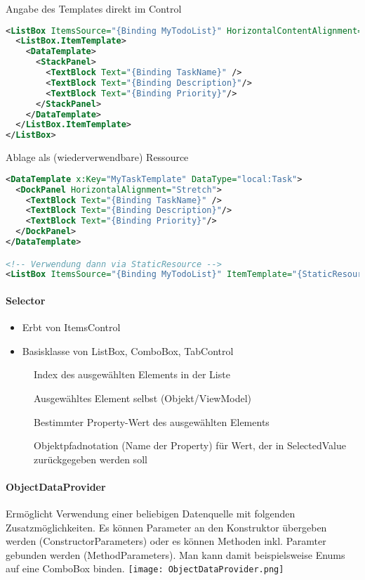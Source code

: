 Angabe des Templates direkt im Control
\begin{lstlisting}[language=xml]
<ListBox ItemsSource="{Binding MyTodoList}" HorizontalContentAlignment="Stretch"> 
  <ListBox.ItemTemplate> 
    <DataTemplate> 
      <StackPanel> 
        <TextBlock Text="{Binding TaskName}" /> 
        <TextBlock Text="{Binding Description}"/> 
        <TextBlock Text="{Binding Priority}"/> 
      </StackPanel> 
    </DataTemplate> 
  </ListBox.ItemTemplate> 
</ListBox> 
\end{lstlisting}

Ablage als (wiederverwendbare) Ressource
\begin{lstlisting}[language=xml]
<DataTemplate x:Key="MyTaskTemplate" DataType="local:Task"> 
  <DockPanel HorizontalAlignment="Stretch"> 
    <TextBlock Text="{Binding TaskName}" /> 
    <TextBlock Text="{Binding Description}"/> 
    <TextBlock Text="{Binding Priority}"/> 
  </DockPanel> 
</DataTemplate>

<!-- Verwendung dann via StaticResource -->
<ListBox ItemsSource="{Binding MyTodoList}" ItemTemplate="{StaticResource MyTaskTemplate}" HorizontalContentAlignment="Stretch" /> 
\end{lstlisting}

\paragraph{Selector}
\begin{itemize}
    \item Erbt von ItemsControl
    \item Basisklasse von ListBox, ComboBox, TabControl
\end{itemize}
\begin{description}
    \item[] Index des ausgewählten Elements in der Liste 
    \item[] Ausgewähltes Element selbst (Objekt/ViewModel) 
    \item[] Bestimmter Property-Wert des ausgewählten Elements 
    \item[] Objektpfadnotation (Name der Property) für Wert, der in SelectedValue zurückgegeben werden soll 
\end{description}

\paragraph{ObjectDataProvider} Ermöglicht Verwendung einer beliebigen Datenquelle mit folgenden Zusatzmöglichkeiten. Es können Parameter an den Konstruktor übergeben werden (ConstructorParameters) oder es können Methoden inkl. Paramter gebunden werden (MethodParameters). Man kann damit beispielsweise Enums auf eine ComboBox binden.
\texttt{[image: ObjectDataProvider.png]}

